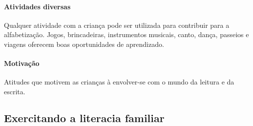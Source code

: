 \documentclass[11pt]{extarticle}
\begin{document}
\paragraph{Atividades diversas} Qualquer atividade com a criança 
pode ser utilizada para contribuir para a alfabetização. Jogos, brincadeiras, 
instrumentos musicais, canto, dança, passeios e viagens oferecem boas 
oportunidades de aprendizado.

\paragraph{Motivação} Atitudes que motivem as crianças à envolver-se com 
o mundo da leitura e da escrita.

\subsection{Exercitando a literacia familiar}


\end{document}
